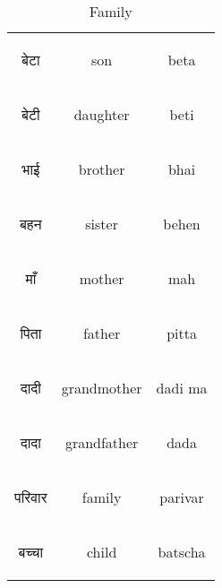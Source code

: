 \begin{table}[H]
    \centering
    \begin{tabular}{c|c|c}
        \begin{hindi} बेटा \end{hindi} & son & beta \\
        \begin{hindi} बेटी \end{hindi} & daughter & beti\\
        \begin{hindi} भाई \end{hindi} & brother & bhai\\
        \begin{hindi} बहन \end{hindi} & sister & behen\\
        \begin{hindi} माँ \end{hindi} & mother & mah\\
        \begin{hindi} पिता \end{hindi} & father & pitta\\
        \begin{hindi} दादी \end{hindi} & grandmother & dadi ma\\
        \begin{hindi} दादा \end{hindi} & grandfather & dada\\
        \begin{hindi} परिवार \end{hindi} & family & parivar\\
        \begin{hindi} बच्चा \end{hindi} & child & batscha \\
    \end{tabular}
    \caption{Family}
    \label{tab:nouns_family}
\end{table}



